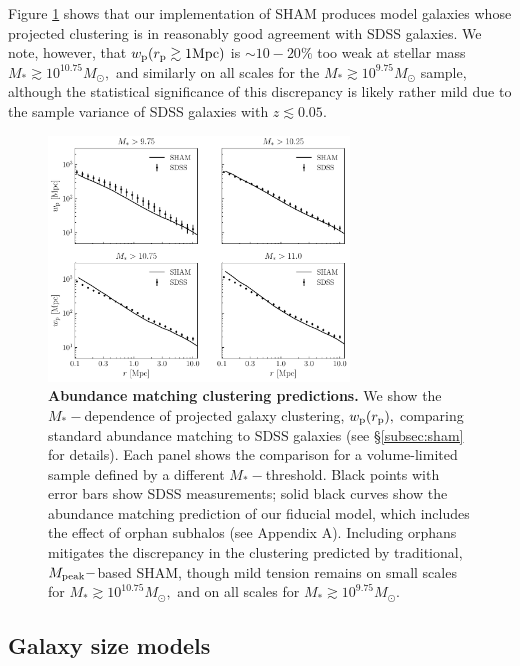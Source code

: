 \documentclass[usenatbib,usegraphicx,letterpaper]{mn2e}
\newcommand{\mstar}{M_{\ast}}
\newcommand{\mpeak}{M_{\rm peak}}
\newcommand{\rproj}{r_{\rm p}}
\newcommand{\wproj}{w_{\rm p}}
\newcommand{\msun}{M_\odot}
\begin{document}
Figure \ref{fig:baseline_sham_clustering} shows that our implementation of SHAM produces model galaxies whose projected clustering is in reasonably good agreement with SDSS galaxies. We note, however, that $\wproj(\rproj\gtrsim1{\rm Mpc})$ is $\sim10-20\%$ too weak at stellar mass $\mstar\gtrsim10^{10.75}\msun,$ and similarly on all scales for the $\mstar\gtrsim10^{9.75}\msun$ sample, although the statistical significance of this discrepancy is likely rather mild due to the sample variance of SDSS galaxies with $z\lesssim0.05.$

\begin{figure}
\centering
\includegraphics[width=8cm]{FIGS/baseline_sham.pdf}
\caption{
{\bf Abundance matching clustering predictions.}
We show the $\mstar-$dependence of projected galaxy clustering, $\wproj(\rproj),$ comparing standard abundance matching to SDSS galaxies (see \S\ref{subsec:sham} for details). Each panel shows the comparison for a volume-limited sample defined by a different $\mstar-$threshold. Black points with error bars show SDSS measurements; solid black curves show the abundance matching prediction of our fiducial model, which includes the effect of orphan subhalos (see Appendix A). Including orphans mitigates the discrepancy in the clustering predicted by traditional, $\mpeak-$based SHAM, though mild tension remains on small scales for $\mstar\gtrsim10^{10.75}\msun,$ and on all scales for $\mstar\gtrsim10^{9.75}\msun.$
}
\label{fig:baseline_sham_clustering}
\end{figure}

\subsection{Galaxy size models}
\label{subsec:model}
\end{document}
